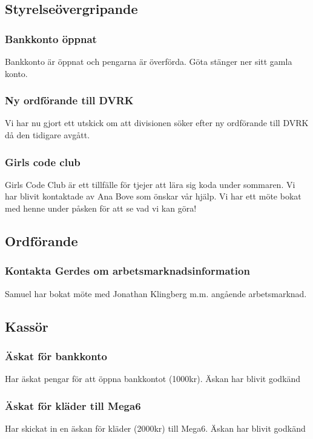 \documentclass[protokoll]{dvd}
\begin{document}
\subsection{Styrelseövergripande}

\subsubsection{Bankkonto öppnat}
Bankkonto är öppnat och pengarna är överförda. Göta stänger ner sitt gamla konto.

\subsubsection{Ny ordförande till DVRK}
Vi har nu gjort ett utskick om att divisionen söker efter ny ordförande till DVRK då den tidigare avgått.

\subsubsection{Girls code club}
Girls Code Club är ett tillfälle för tjejer att lära sig koda under sommaren. Vi har blivit kontaktade av Ana Bove som önskar vår hjälp. Vi har ett möte bokat med henne under påsken för att se vad vi kan göra!

\subsection{Ordförande}

\subsubsection{Kontakta Gerdes om arbetsmarknadsinformation}
Samuel har bokat möte med Jonathan Klingberg m.m. angående arbetsmarknad.

\subsection{Kassör}

\subsubsection{Äskat för bankkonto}
Har äskat pengar för att öppna bankkontot (1000kr). Äskan har blivit godkänd

\subsubsection{Äskat för kläder till Mega6}
Har skickat in en äskan för kläder (2000kr) till Mega6. Äskan har blivit godkänd
\end{document}
